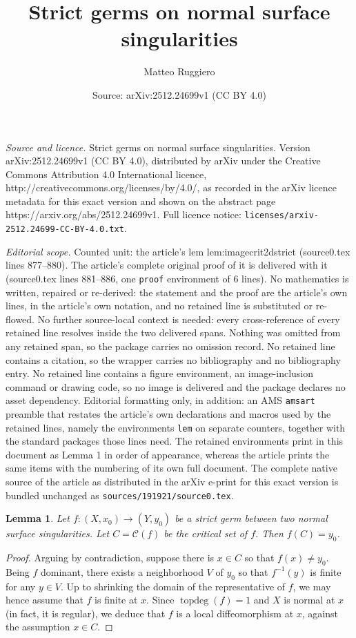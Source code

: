 \documentclass[10pt,a4paper]{amsart}
\title{Strict germs on normal surface singularities}
\author{Matteo Ruggiero}
\date{Source: arXiv:2512.24699v1 (CC BY 4.0)}
\newtheorem{lem}{Lemma}
\newcommand{\Crit}[1]{\mc{C}(#1)} %
\newcommand{\mc}{\mathcal}
\newcommand{\on}[1]{\operatorname{#1}}
\begin{document}
\maketitle

\noindent\emph{Source and licence.} Strict germs on normal surface singularities. Version arXiv:2512.24699v1 (CC BY 4.0), distributed by arXiv under the Creative Commons Attribution 4.0 International licence, http://creativecommons.org/licenses/by/4.0/, as recorded in the arXiv licence metadata for this exact version and shown on the abstract page https://arxiv.org/abs/2512.24699v1. Full licence notice: \texttt{licenses/arxiv-2512.24699-CC-BY-4.0.txt}.\par\smallskip

\noindent\textit{Editorial scope.} Counted unit: the article's lem lem:imagecrit2dstrict (source0.tex lines 877--880). The article's complete original proof of it is delivered with it (source0.tex lines 881--886, one \texttt{proof} environment of 6 lines). No mathematics is written, repaired or re-derived: the statement and the proof are the article's own lines, in the article's own notation, and no retained line is substituted or re-flowed.  No further source-local context is needed: every cross-reference of every retained line resolves inside the two delivered spans.  Nothing was omitted from any retained span, so the package carries no omission record.  No retained line contains a citation, so the wrapper carries no bibliography and no bibliography entry.  No retained line contains a figure environment, an image-inclusion command or drawing code, so no image is delivered and the package declares no asset dependency.  Editorial formatting only, in addition: an AMS \texttt{amsart} preamble that restates the article's own declarations and macros used by the retained lines, namely the environments \texttt{lem} on separate counters, together with the standard packages those lines need.  The retained environments print in this document as Lemma 1 in order of appearance, whereas the article prints the same items with the numbering of its own full document.  The complete native source of the article as distributed in the arXiv e-print for this exact version is bundled unchanged as \texttt{sources/191921/source0.tex}.
\begin{lem}\label{lem:imagecrit2dstrict}
Let $f \colon (X,x_0) \to (Y,y_0)$ be a strict germ between two normal surface singularities.
Let $C=\Crit{f}$ be the critical set of $f$. Then $f(C)=y_0$.
\end{lem}

\begin{proof}
Arguing by contradiction, suppose there is $x \in C$ so that $f(x) \neq y_0$.
Being $f$ dominant, there exists a neighborhood $V$ of $y_0$ so that $f^{-1}(y)$ is finite for any $y \in V$.
Up to shrinking the domain of the representative of $f$, we may hence assume that $f$ is finite at $x$.
Since $\on{topdeg}(f)=1$ and $X$ is normal at $x$ (in fact, it is regular), we deduce that $f$ is a local diffeomorphism at $x$, against the assumption $x \in C$.
\end{proof}
\end{document}
